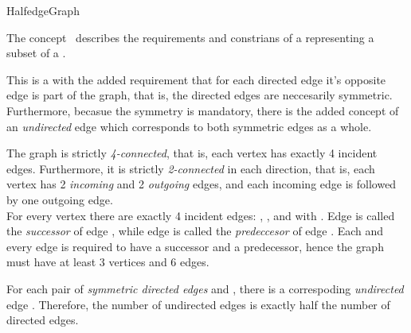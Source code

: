 
\begin{ccRefConcept}{HalfedgeGraph}


\ccDefinition

The concept \ccRefName\ describes the requirements and constrians of a  representing a subset of a .

This is a  with the added requirement that for each directed edge  it's opposite edge  is part of the graph, that is, the directed edges are neccesarily symmetric. Furthermore, becasue the symmetry is mandatory, there is the added concept of an {\em undirected} edge which corresponds to both symmetric edges as a whole.
 
The graph is strictly {\em 4-connected}, that is, each vertex has exactly 4 incident edges. Furthermore, it is strictly {\em 2-connected} in each direction, that is, each vertex has 2 {\em incoming} and 2 {\em outgoing} edges, and each incoming edge is followed by one outgoing edge.\\
For every vertex  there are exactly 4 incident edges: , ,  and  with . Edge  is called the {\em successor} of edge , while edge  is called the {\em predeccesor} of edge . Each and every edge is required to have a successor and a predecessor, hence the graph must have at least 3 vertices and 6 edges. 

For each pair of {\em symmetric directed edges}  and , there is a correspoding {\em undirected} edge . Therefore, the number of undirected edges is exactly half the number of directed edges.


\end{ccRefConcept}
